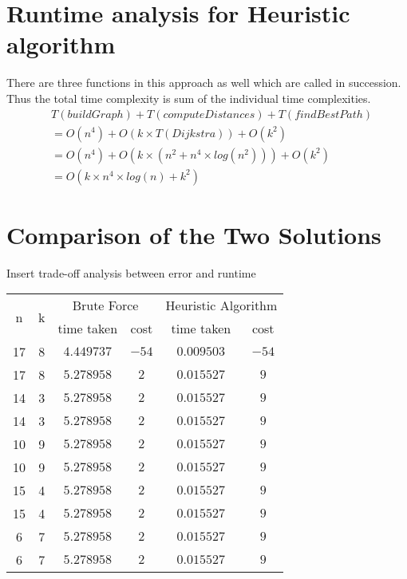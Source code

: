 \documentclass[12pt]{report}
\begin{document}
\section{Runtime analysis for Heuristic algorithm}
There are three functions in this approach as well which are called in succession. Thus the total time complexity is sum of the individual time complexities.
\begin{equation}
\begin{aligned}
    &T({buildGraph}) + T({computeDistances}) + T({findBestPath})\\
    &= O(n^4) + O(k \times T({Dijkstra})) + O(k^2)\\
    &= O(n^4) + O(k \times (n^2 + n^4 \times log(n^2))) + O(k^2)\\
    &= O(k \times n^4 \times log(n) + k^2)
\end{aligned}
\end{equation}

\section{Comparison of the Two Solutions}
Insert trade-off analysis between error and runtime

\begin{center}
\begin{tabular}{ |c|c||c|c|c|c| } 
 \hline
 \multirow{2}{*}{n} &
 \multirow{2}{*}{k} & \multicolumn{2}{|c|}{Brute Force} & \multicolumn{2}{|c|}{Heuristic Algorithm}\\
 \cline{3-6}
 & & time taken & cost &time taken & cost \\
 \hline\hline
 17 & 8 & $4.449737$ & $-54$  & $0.009503$ & $-54$\\
 \hline
 17 & 8 & $5.278958$& $2$  & $0.015527$& $9$\\ 
 \hline
 14 & 3 & $5.278958$& $2$  & $0.015527$& $9$\\ 
 \hline
 14 & 3 & $5.278958$& $2$  & $0.015527$& $9$\\ 
 \hline
 10 & 9 & $5.278958$& $2$  & $0.015527$& $9$\\ 
 \hline
 10 & 9 & $5.278958$& $2$  & $0.015527$& $9$\\ 
 \hline
 15 & 4 & $5.278958$& $2$  & $0.015527$& $9$\\ 
 \hline
 15 & 4 & $5.278958$& $2$  & $0.015527$& $9$\\ 
 \hline
 6 & 7 & $5.278958$& $2$  & $0.015527$& $9$\\ 
 \hline
 6 & 7 & $5.278958$& $2$  & $0.015527$& $9$\\ 
 \hline
 
\end{tabular}
\end{center}
\end{document}
